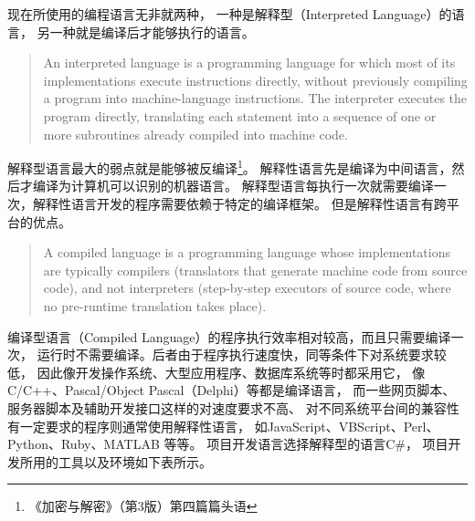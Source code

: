 \documentclass{book}
\begin{document}
现在所使用的编程语言无非就两种，
一种是解释型（Interpreted Language）的语言，
另一种就是编译后才能够执行的语言。

\begin{quotation}
An interpreted language is a programming language for 
which most of its implementations execute instructions directly, 
without previously compiling a program into machine-language instructions. 
The interpreter executes the program directly, 
translating each statement into a sequence of one or more subroutines already compiled into machine code.
\end{quotation}

解释型语言最大的弱点就是能够被反编译\footnote{《加密与解密》（第3版）第四篇篇头语}。
解释性语言先是编译为中间语言，然后才编译为计算机可以识别的机器语言。
解释型语言每执行一次就需要编译一次，解释性语言开发的程序需要依赖于特定的编译框架。
但是解释性语言有跨平台的优点。

\begin{quotation}
A compiled language is a programming language whose implementations 
are typically compilers (translators that generate machine code from source code), 
and not interpreters (step-by-step executors of source code, where no pre-runtime translation takes place).
\end{quotation}

编译型语言（Compiled Language）的程序执行效率相对较高，而且只需要编译一次，
运行时不需要编译。后者由于程序执行速度快，同等条件下对系统要求较低，
因此像开发操作系统、大型应用程序、数据库系统等时都采用它，
像C/C++、Pascal/Object Pascal（Delphi）等都是编译语言，
而一些网页脚本、服务器脚本及辅助开发接口这样的对速度要求不高、
对不同系统平台间的兼容性有一定要求的程序则通常使用解释性语言，
如JavaScript、VBScript、Perl、Python、Ruby、MATLAB 等等。
项目开发语言选择解释型的语言C\#，
项目开发所用的工具以及环境如下表所示。
\end{document}

